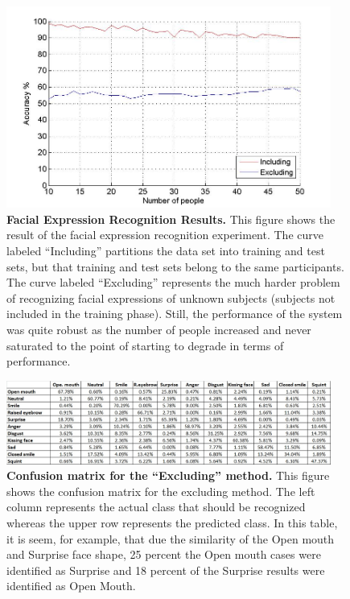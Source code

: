 \documentclass[]{article}
\begin{document}
\begin{figure}[ht]
\begin{center}
\vspace{-3mm}
\includegraphics[width=0.95\textwidth]{figures/figureRecognizeFacialExpressionTrue.jpg}
\end{center}
\caption{\textbf{Facial Expression Recognition Results.} This figure shows the result of the facial expression
recognition experiment. The curve labeled ``Including'' partitions the data set into training and test sets, but that
training and test sets belong to the same participants. The curve labeled ``Excluding'' represents the much harder
problem of recognizing facial expressions of unknown subjects (subjects not included in the training phase). Still, the performance 
of the system was quite robust as the number of people increased and never saturated to the point of starting to
degrade in terms of performance.}
\label{feRecognition}
\end{figure}


\begin{figure}[ht]
\begin{center}
\vspace{-3mm}
\includegraphics[width=0.95\textwidth]{figures/confusionExcluding.jpg}
\end{center}
\caption{\textbf{Confusion matrix for the ``Excluding'' method.} This figure
shows the confusion matrix for the excluding method. The left column represents the
actual class that should be recognized whereas the upper row represents the
predicted class. In this table, it is seem, for example, that due the similarity
of the Open mouth and Surprise face shape, 25 percent the Open mouth cases were
identified as Surprise and 18 percent of the Surprise results were identified as
Open Mouth.}
\label{coExcluding}
\end{figure}
\end{document}
